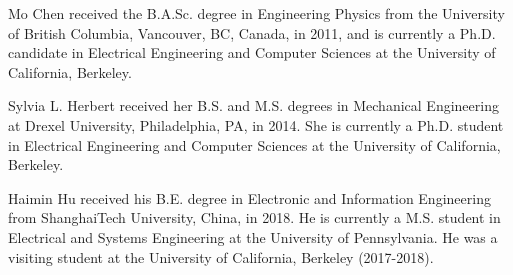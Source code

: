 \documentclass[journal]{IEEEtran}
\begin{document}

\begin{IEEEbiography}{Mo Chen}
	received the B.A.Sc. degree in Engineering Physics from the University of British Columbia, Vancouver, BC, Canada, in 2011, and is currently a Ph.D. candidate in Electrical Engineering and Computer Sciences at the University of California, Berkeley.\vspace{-2cm}
\end{IEEEbiography}
\begin{IEEEbiography}{Sylvia L. Herbert}
	received her B.S. and M.S. degrees in Mechanical Engineering at Drexel University, Philadelphia, PA, in 2014. She is currently a Ph.D. student in Electrical Engineering and Computer Sciences at the University of California, Berkeley.\vspace{-2cm}
\end{IEEEbiography}
\begin{IEEEbiography}{Haimin Hu}
	received his B.E. degree in Electronic and Information Engineering from ShanghaiTech University, China, in 2018. He is currently a M.S. student in Electrical and Systems Engineering at the University of Pennsylvania. He was a visiting student at the University of California, Berkeley (2017-2018).\vspace{-2cm}
\end{IEEEbiography}
\end{document}
